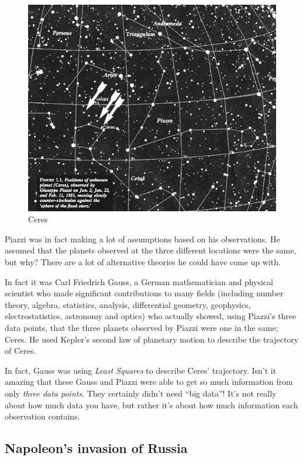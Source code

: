 \begin{figure}[H]
\begin{center}
\includegraphics[scale=0.4]{ceres.jpg}
\end{center}
\caption{Ceres}
\label{fig:ceres}
\end{figure}

Piazzi was in fact making a lot of assumptions based on his observations. He assumed that the planets observed at the three different locations were the same, but why? There are a lot of alternative theories he could have come up with.

In fact it was Carl Friedrich Gauss, a German mathematician and physical scientist who made significant contributions to many fields (including number theory, algebra, statistics, analysis, differential geometry, geophysics, electrostatistics, astronomy and optics) who actually showed, using Piazzi's three data points, that the three planets observed by Piazzi were one in the same; Ceres. He used Kepler's second law of planetary motion to describe the trajectory of Ceres.

In fact, Gauss was using \emph{Least Squares} to describe Ceres' trajectory. Isn't it amazing that these Gauss and Piazzi were able to get so much information from only \emph{three data points}. They certainly didn't need ``big data''! It's not really about how much data you have, but rather it's about how much information each observation contains.


\subsection*{Napoleon's invasion of Russia}


